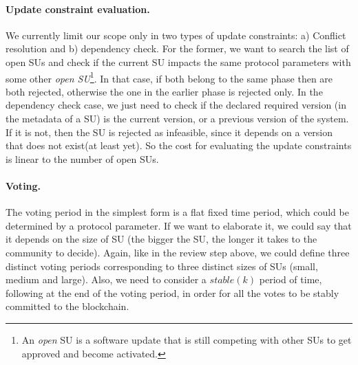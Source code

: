 \paragraph{Update constraint evaluation.} We currently limit our scope only in two types of update constraints: a) Conflict resolution and b) dependency check. For the former, we want to search the list of open SUs and check if the current SU impacts the same protocol parameters with some other \emph{open SU}\footnote{An \emph{open} SU is a software update that is still competing with other SUs to get approved and become activated.}. In that case, if both belong to the same  phase then are both rejected, otherwise the one in the earlier phase is rejected only. In the dependency check case, we just need to check if the declared required version (in the metadata of a SU) is the current version, or a previous version of the system. If it is not, then the SU is rejected as infeasible, since it depends on a version that does not exist(at least yet). So the cost for evaluating the update constraints is linear to the number of open SUs.

\paragraph{Voting.} The voting period in the simplest form is a flat fixed time period, which could be determined by a protocol parameter. If we want to elaborate it, we could say that it depends on the size of SU (the bigger the SU, the longer it takes to the community to decide). Again, like in the review step above, we could define three distinct voting periods corresponding to three distinct sizes of SUs (small, medium and large). Also, we need to consider a $stable(k)$ period of time, following at the end of the voting period, in order for all the votes to be stably committed to the blockchain.

